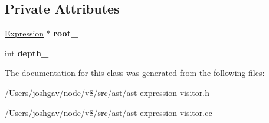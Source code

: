 \subsection*{Private Attributes}
\begin{DoxyCompactItemize}
\item 
\hyperlink{classv8_1_1internal_1_1_expression}{Expression} $\ast$ {\bfseries root\+\_\+}\hypertarget{classv8_1_1internal_1_1_ast_expression_visitor_a7c27b20bc86c934d2a8bfa55aeebaa3a}{}\label{classv8_1_1internal_1_1_ast_expression_visitor_a7c27b20bc86c934d2a8bfa55aeebaa3a}

\item 
int {\bfseries depth\+\_\+}\hypertarget{classv8_1_1internal_1_1_ast_expression_visitor_a7f353591798649f576dd57315caed479}{}\label{classv8_1_1internal_1_1_ast_expression_visitor_a7f353591798649f576dd57315caed479}

\end{DoxyCompactItemize}


The documentation for this class was generated from the following files\+:\begin{DoxyCompactItemize}
\item 
/\+Users/joshgav/node/v8/src/ast/ast-\/expression-\/visitor.\+h\item 
/\+Users/joshgav/node/v8/src/ast/ast-\/expression-\/visitor.\+cc\end{DoxyCompactItemize}
